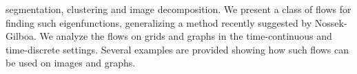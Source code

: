 \begin{multicols}{2}
{segmentation, clustering and image decomposition.  We present a class
of flows for finding such eigenfunctions, generalizing a method recently
suggested by Nossek-Gilboa.  We analyze the flows on grids and graphs
in the time-continuous and time-discrete settings. 
Several examples are provided showing how such flows can be
used on images and graphs.}\\
\\ 
        \\
        \\\\
\\
\end{multicols}

